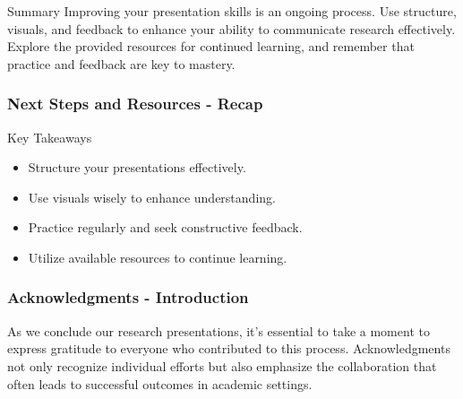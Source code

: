 \documentclass[aspectratio=169]{beamer}
\begin{document}
\begin{frame}[fragile]
    \begin{block}{Summary}
        Improving your presentation skills is an ongoing process. Use structure, visuals, and feedback to enhance your ability to communicate research effectively. Explore the provided resources for continued learning, and remember that practice and feedback are key to mastery.
    \end{block}
\end{frame}

\begin{frame}[fragile]
    \frametitle{Next Steps and Resources - Recap}
    \begin{block}{Key Takeaways}
        \begin{itemize}
            \item Structure your presentations effectively.
            \item Use visuals wisely to enhance understanding.
            \item Practice regularly and seek constructive feedback.
            \item Utilize available resources to continue learning.
        \end{itemize}
    \end{block}
\end{frame}

\begin{frame}[fragile]
    \frametitle{Acknowledgments - Introduction}
    As we conclude our research presentations, it’s essential to take a moment to express gratitude to everyone who contributed to this process. 
    Acknowledgments not only recognize individual efforts but also emphasize the collaboration that often leads to successful outcomes in academic settings.
\end{frame}
\end{document}
